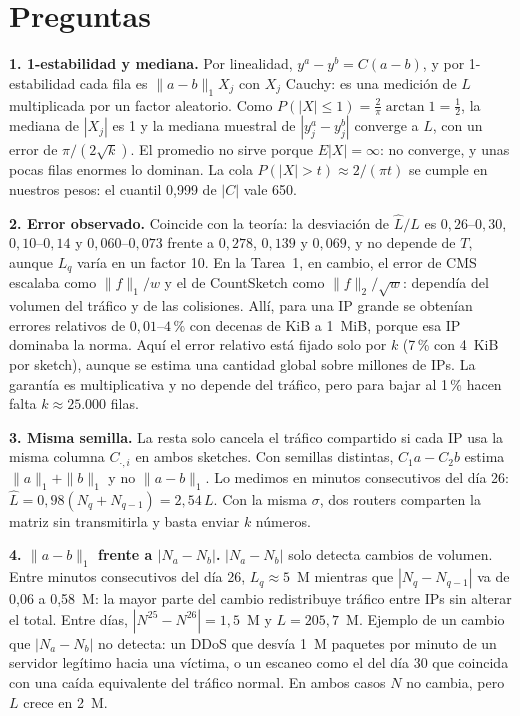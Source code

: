 \documentclass[conference]{IEEEtran}
\newcommand{\Lh}{\hat L}
\begin{document}
\section{Preguntas}

\textbf{1. 1-estabilidad y mediana.} Por linealidad, $y^a-y^b=C(a-b)$, y por 1-estabilidad cada fila es $\|a-b\|_1X_j$ con $X_j$ Cauchy: es una medición de $L$ multiplicada por un factor aleatorio. Como $P(|X|\le1)=\frac2\pi\arctan1=\frac12$, la mediana de $|X_j|$ es 1 y la mediana muestral de $|y^a_j-y^b_j|$ converge a $L$, con un error de $\pi/(2\sqrt k)$. El promedio no sirve porque $E|X|=\infty$: no converge, y unas pocas filas enormes lo dominan. La cola $P(|X|>t)\approx2/(\pi t)$ se cumple en nuestros pesos: el cuantil 0,999 de $|C|$ vale 650.

\textbf{2. Error observado.} Coincide con la teoría: la desviación de $\Lh/L$ es $0{,}26$--$0{,}30$, $0{,}10$--$0{,}14$ y $0{,}060$--$0{,}073$ frente a $0{,}278$, $0{,}139$ y $0{,}069$, y no depende de $T$, aunque $L_q$ varía en un factor 10. En la Tarea~1, en cambio, el error de CMS escalaba como $\|f\|_1/w$ y el de CountSketch como $\|f\|_2/\sqrt w$: dependía del volumen del tráfico y de las colisiones. Allí, para una IP grande se obtenían errores relativos de $0{,}01$--$4\,\%$ con decenas de KiB a 1~MiB, porque esa IP dominaba la norma. Aquí el error relativo está fijado solo por $k$ (7\,\% con 4~KiB por sketch), aunque se estima una cantidad global sobre millones de IPs. La garantía es multiplicativa y no depende del tráfico, pero para bajar al 1\,\% hacen falta $k\approx25.000$ filas.

\textbf{3. Misma semilla.} La resta solo cancela el tráfico compartido si cada IP usa la misma columna $C_{\cdot,i}$ en ambos sketches. Con semillas distintas, $C_1a-C_2b$ estima $\|a\|_1+\|b\|_1$ y no $\|a-b\|_1$. Lo medimos en minutos consecutivos del día 26: $\Lh=0{,}98(N_q+N_{q-1})=2{,}54\,L$. Con la misma $\sigma$, dos routers comparten la matriz sin transmitirla y basta enviar $k$ números.

\textbf{4. $\|a-b\|_1$ frente a $|N_a-N_b|$.} $|N_a-N_b|$ solo detecta cambios de volumen. Entre minutos consecutivos del día 26, $L_q\approx5$~M mientras que $|N_q-N_{q-1}|$ va de 0,06 a 0,58~M: la mayor parte del cambio redistribuye tráfico entre IPs sin alterar el total. Entre días, $|N^{25}-N^{26}|=1{,}5$~M y $L=205{,}7$~M. Ejemplo de un cambio que $|N_a-N_b|$ no detecta: un DDoS que desvía 1~M paquetes por minuto de un servidor legítimo hacia una víctima, o un escaneo como el del día 30 que coincida con una caída equivalente del tráfico normal. En ambos casos $N$ no cambia, pero $L$ crece en 2~M.
\end{document}
